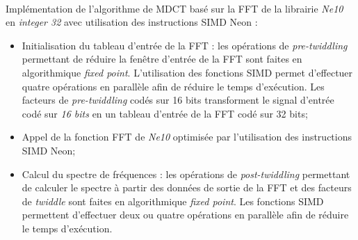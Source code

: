 \documentclass{article}
\begin{document}
\paragraph{}
Implémentation de l'algorithme de MDCT basé sur la FFT de la librairie \emph{Ne10} en \emph{integer 32} avec utilisation des instructions SIMD Neon :
\begin{itemize}
    \item Initialisation du tableau d'entrée de la FFT : les opérations de \emph{pre-twiddling} permettant de réduire la fenêtre d'entrée de la FFT sont faites en algorithmique \emph{fixed point}. L'utilisation des fonctions SIMD permet d'effectuer quatre opérations en parallèle afin de réduire le temps d'exécution. Les facteurs de \emph{pre-twiddling} codés sur 16 bits transforment le signal d'entrée codé sur \emph{16 bits} en un tableau d'entrée de la FFT codé sur 32 bits;
    \item Appel de la fonction FFT de \emph{Ne10} optimisée par l'utilisation des instructions SIMD Neon;
    \item Calcul du spectre de fréquences : les opérations de \emph{post-twiddling} permettant de calculer le spectre à partir des données de sortie de la FFT et des facteurs de \emph{twiddle} sont faites en algorithmique \emph{fixed point}. Les fonctions SIMD permettent d'effectuer deux ou quatre opérations en parallèle afin de réduire le temps d'exécution.
\end{itemize}
\lstset{language=C++}
\newpage
\end{document}
